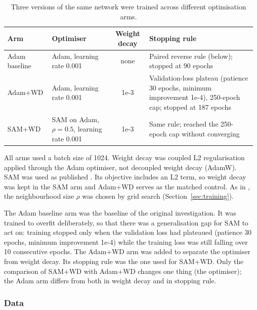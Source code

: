\begin{table}[htbp]
  \centering
  \caption{Three versions of the same network were trained across different optimisation arms.}
  \label{tab:arms}
  \small
  \renewcommand{\arraystretch}{1.25}
  \begin{tabularx}{\textwidth}{@{}>{\raggedright\arraybackslash}p{2.1cm} >{\raggedright\arraybackslash}p{3.3cm} c >{\raggedright\arraybackslash}X@{}}
    \toprule
    \textbf{Arm} & \textbf{Optimiser} & \textbf{Weight decay} & \textbf{Stopping rule} \\
    \midrule
    Adam baseline & Adam, learning rate 0.001 & none &
      Paired reverse rule (below); stopped at 90 epochs \\
    Adam+WD & Adam, learning rate 0.001 & 1e-3 &
      Validation-loss plateau (patience 30 epochs, minimum improvement 1e-4), 250-epoch cap; stopped at 187 epochs \\
    SAM+WD & SAM on Adam, $\rho = 0.5$, learning rate 0.001 & 1e-3 &
      Same rule; reached the 250-epoch cap without converging \\
    \bottomrule
  \end{tabularx}
\end{table}

All arms used a batch size of 1024. Weight decay was coupled L2 regularisation applied through the Adam optimiser, not decoupled weight decay (AdamW). SAM was used as published \citep{foret2021}. Its objective includes an L2 term, so weight decay was kept in the SAM arm and Adam+WD serves as the matched control. As in \citet{foret2021}, the neighbourhood size $\rho$ was chosen by grid search (Section~\ref{sec:training}).

The Adam baseline arm was the baseline of the original investigation. It was trained to overfit deliberately, so that there was a generalisation gap for SAM to act on: training stopped only when the validation loss had plateaued (patience 30 epochs, minimum improvement 1e-4) while the training loss was still falling over 10 consecutive epochs. The Adam+WD arm was added to separate the optimiser from weight decay. Its stopping rule was the one used for SAM+WD. Only the comparison of SAM+WD with Adam+WD changes one thing (the optimiser); the Adam arm differs from both in weight decay and in stopping rule.

\subsubsection{Data}
\label{sec:data}

